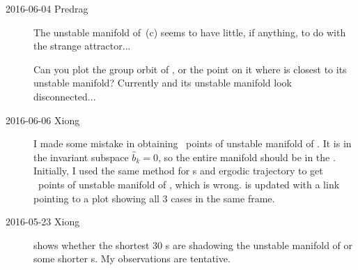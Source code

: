 \begin{description}
\item[2016-06-04 Predrag]
The unstable manifold of  \,(c) seems to have
little, if anything, to do with the strange attractor...

Can you plot the group orbit of , or the point on it where  is
closest to its unstable manifold? Currently  and its unstable manifold
look disconnected...

\item[2016-06-06 Xiong]
I made some mistake in obtaining \PoincSec\ points of unstable
manifold of . It is in the invariant subspace
$\hat{b}_k=0$, so the entire manifold should be in the \PoincSec. Initially,
I used the same method for \po s and ergodic trajectory to get \PoincSec\ points
of unstable manifold of , which is wrong.
 is updated with a link pointing to a plot showing
all 3 cases in the same frame.

\item[2016-05-23 Xiong]
   shows whether the shortest 30 \rpo s are shadowing
  the unstable manifold of  or some shorter \rpo s. My observations
  are tentative.


\end{description}
